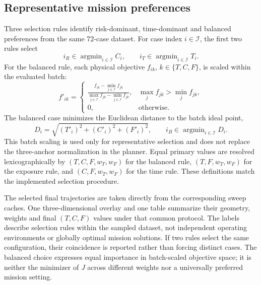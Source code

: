 \subsection{Representative mission preferences}
\label{sec:representative}

Three selection rules identify risk-dominant, time-dominant and balanced
preferences from the same 72-case dataset. For case index $i\in\mathcal I$,
the first two rules select
\begin{equation}
 i_R\in\mathop{\arg\min}_{i\in\mathcal I} C_i,\qquad
 i_T\in\mathop{\arg\min}_{i\in\mathcal I} T_i.
 \label{ex:eq:extremecases}
\end{equation}
For the balanced rule, each physical objective $f_{ik}$,
$k\in\{T,C,F\}$, is scaled within the evaluated batch:
\begin{equation}
 f'_{ik}=\begin{cases}
 \displaystyle\frac{f_{ik}-\min_{j\in\mathcal I}f_{jk}}
 {\max_{j\in\mathcal I}f_{jk}-\min_{j\in\mathcal I}f_{jk}},
 &\max_j f_{jk}>\min_j f_{jk},\\
 0,&\text{otherwise}.
 \end{cases}
 \label{ex:eq:batchscale}
\end{equation}
The balanced case minimizes the Euclidean distance to the batch ideal point,
\begin{equation}
 D_i=\sqrt{(T'_i)^2+(C'_i)^2+(F'_i)^2},\qquad
 i_B\in\mathop{\arg\min}_{i\in\mathcal I}D_i.
 \label{ex:eq:balancedcase}
\end{equation}
This batch scaling is used only for representative selection and does
not replace the three-anchor normalization in the planner. Equal primary
values are resolved lexicographically by $(T,C,F,w_T,w_F)$ for the balanced
rule, $(T,F,w_T,w_F)$ for the exposure rule, and $(C,F,w_T,w_F)$ for the
time rule. These definitions match the implemented selection procedure.

The selected final trajectories are taken directly from the corresponding
sweep caches. One three-dimensional overlay and one table summarize their
geometry, weights and final $(T,C,F)$ values under that common protocol.
The labels describe selection rules within the sampled dataset, not
independent operating environments or globally optimal mission solutions.
If two rules select the same configuration, their coincidence is reported
rather than forcing distinct cases. The balanced choice expresses equal
importance in batch-scaled objective space; it is neither the minimizer
of $J$ across different weights nor a universally preferred mission setting.


